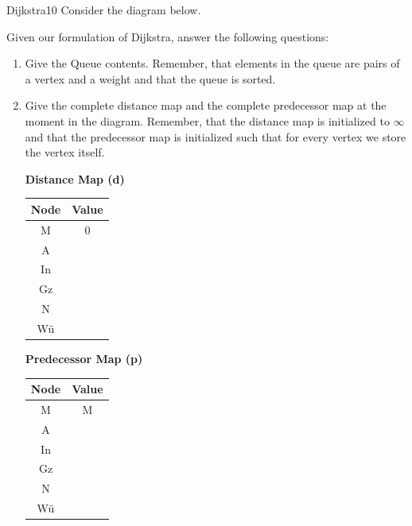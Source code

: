 \documentclass[twoside,a4paper]{article}
\begin{document}
\begin{task}{Dijkstra}{10}{}
  Consider the diagram below.


  Given our formulation of Dijkstra, answer the following questions:
  \begin{enumerate}
  \item{Give the Queue contents. Remember, that elements in the queue are pairs of a vertex and a weight and that the queue is sorted.
\vspace*{2cm}
  }
  \item{Give the complete distance map and the complete predecessor map at the moment in the diagram. Remember, that the distance map is initialized to $\infty$ and that the predecessor map is initialized such that for every vertex we store the vertex itself.

    \parbox{.5\textwidth}{\textbf{Distance Map (d)}\par
      \vspace*{1em}\Large\begin{tabular}{|c|c|}
        \hline
        \textbf{Node} & \textbf{Value} \\ \hline
        M & 0 \\ \hline
        A & \\ \hline
        In & \\ \hline
        Gz & \\ \hline
        N & \\ \hline
        Wü & \\ \hline
        \end{tabular}
        }
    \parbox{.5\textwidth}{\textbf{Predecessor Map (p)}\par
      \vspace*{1em}\Large\begin{tabular}{|c|c|}
        \hline
        \textbf{Node} & \textbf{Value} \\ \hline
        M & M \\ \hline
        A & \\ \hline
        In & \\ \hline
        Gz & \\ \hline
        N & \\ \hline
        Wü & \\ \hline
        \end{tabular}
        }


}
\end{enumerate}
\end{task}
\end{document}
